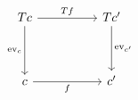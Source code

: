 \[\begin{tikzcd}
	Tc && {Tc'} \\
	\\
	c && {c'}
	\arrow["f"', from=3-1, to=3-3]
	\arrow["Tf", from=1-1, to=1-3]
	\arrow["{\mathrm{ev}_{c}}"', from=1-1, to=3-1]
	\arrow["{\mathrm{ev}_{c'}}", from=1-3, to=3-3]
\end{tikzcd}\]